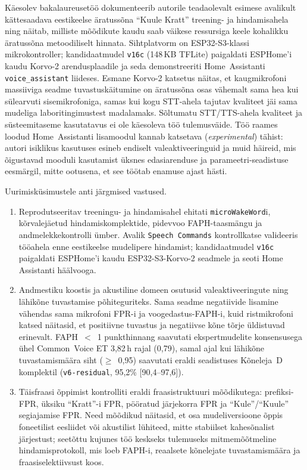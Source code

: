 Käesolev bakalaureusetöö dokumenteerib autorile teadaolevalt esimese avalikult kättesaadava eestikeelse äratussõna \enquote{Kuule Kratt} treening- ja hindamisahela ning näitab, milliste mõõdikute kaudu saab väikese ressursiga keele kohalikku äratussõna metoodiliselt hinnata. Sihtplatvorm on ESP32-S3-klassi mikrokontroller; kandidaatmudel \texttt{v16c} (148\,KB TFLite) paigaldati ESPHome'i kaudu Korvo-2 arendusplaadile ja seda demonstreeriti Home~Assistanti \texttt{voice\_assistant} liideses. Esmane Korvo-2 katsetus näitas, et kaugmikrofoni massiiviga seadme tuvastuskäitumine on äratussõna osas vähemalt sama hea kui sülearvuti sisemikrofoniga, samas kui kogu STT-ahela tajutav kvaliteet jäi sama mudeliga laboritingimustest madalamaks. Sõltumatu STT/TTS-ahela kvaliteet ja süsteemitaseme kasutatavus ei ole käesoleva töö tulemusväide. Töö raames loodud Home~Assistanti lisamoodul kannab katsetava (\emph{experimental}) tähist: autori isiklikus kasutuses esineb endiselt valeaktiveeringuid ja muid häireid, mis õigustavad mooduli kasutamist üksnes edasiarenduse ja parameetri-seadistuse eesmärgil, mitte ootusena, et see töötab enamuse ajast hästi.

Uurimisküsimustele anti järgmised vastused.
\begin{enumerate}[nosep]
    \item Reprodutseeritav treeningu- ja hindamisahel ehitati \texttt{microWakeWord}i, kõrvalejäetud hindamiskomplektide, pidevvoo FAPH-taasmängu ja andmelekkekontrolli ümber. Avalik \texttt{Speech Commands} kontrollkatse valideeris tööahela enne eestikeelse mudelipere hindamist; kandidaatmudel \texttt{v16c} paigaldati ESPHome'i kaudu ESP32-S3-Korvo-2 seadmele ja seoti Home Assistanti häälvooga.
    \item Andmestiku koostis ja akustiline domeen osutusid valeaktiveeringute ning lähikõne tuvastamise põhiteguriteks. Sama seadme negatiivide lisamine vähendas sama mikrofoni FPR-i ja voogedastus-FAPH-i, kuid ristmikrofoni katsed näitasid, et positiivne tuvastus ja negatiivse kõne tõrje üldistuvad erinevalt. FAPH~$<$~1 punkthinnang saavutati ekspertmudelite konsensusega ühel Common~Voice ET 3,82\,h rajal (0,79), samal ajal kui lähikõne tuvastamismäära siht ($\geq$~0{,}95) saavutati eraldi seadistuses Kõneleja~D komplektil (\texttt{v6-residual}, 95,2\% [90,4--97,6]).
    \item Täisfraasi õppimist kontrolliti eraldi fraasistruktuuri mõõdikutega: prefiksi-FPR, üksiku \enquote{Kratt}-i FPR, pööratud järjekorra FPR ja \enquote{Kule}/\enquote{Kuule} segiajamise FPR. Need mõõdikud näitasid, et osa mudeliversioone õppis foneetilist eesliidet või akustilist lühiteed, mitte stabiilset kahesõnalist järjestust; seetõttu kujunes töö keskseks tulemuseks mitmemõõtmeline hindamisprotokoll, mis loeb FAPH-i, reaalsete kõnelejate tuvastamismäära ja fraasiselektiivsust koos.
\end{enumerate}

